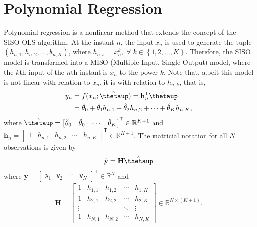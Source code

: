 \documentclass[english]{sobraep}
\newcommand{\trans}{\mathsf{T}}
\begin{document}
\section{Polynomial Regression}

Polynomial regression is a nonlinear method that extends the concept of the SISO OLS algorithm. At the instant \(n\), the input \(x_n\) is used to generate the tuple \(\left( h_{n,1}, h_{n,2}, ..., h_{n,K} \right)\), where \(h_{n,k}=x_n^k,\;\forall\; k \in \left\{ 1, 2, ..., K \right\}\). Therefore, the SISO model is transformed into a MISO (Multiple Input, Single Output) model, where the \(k\)th input of the \(n\)th instant is \(x_n\) to the power \(k\). Note that, albeit this model is not linear with relation to \(x_n\), it is with relation to \(h_{n,k}\), that is,
\begin{align}
    y_n & = f(x_n;\hat{\boldsymbol{\thetaup}}) = \mathbf{h}_n^\trans \hat{\boldsymbol{\thetaup}} \nonumber \\
    & = \hat{\theta}_0 + \hat{\theta}_1 h_{n,1} + \hat{\theta}_2 h_{n,2}  + \cdots + \hat{\theta}_K h_{n,K},
\end{align}
where \(\hat{\boldsymbol{\thetaup}} = \begin{bmatrix}
    \hat{\theta}_0 & \hat{\theta}_0 & \cdots & \hat{\theta}_K
\end{bmatrix}^\trans \in \mathbb{R}^{K+1}\) and \(\mathbf{h}_n = \begin{bmatrix}
    1 & h_{n,1} & h_{n,2} & \cdots & h_{n,K}
\end{bmatrix}^\trans  \in \mathbb{R}^{K+1}\). The matricial notation for all \(N\) observations is given by
\begin{align}
    \hat{\mathbf{y}} = \mathbf{H} \hat{\boldsymbol{\thetaup}}
\end{align}
where \(\mathbf{y} = \begin{bmatrix}
    y_{1} & y_{2} & \cdots & y_{N}
\end{bmatrix}^\trans  \in \mathbb{R}^{N}\) and
\begin{align}
    \mathbf{H} = \begin{bmatrix}
        1 & h_{1,1} & h_{1,2} & \cdots & h_{1,K} \\
        1 & h_{2,1} & h_{2,2} & \cdots & h_{2,K} \\
        \vdots & & & \ddots & \vdots \\
        1 & h_{N,1} & h_{N,2} & \cdots & h_{N,K}
    \end{bmatrix} \in \mathbb{R}^{N\times (K+1)}.
\end{align}
\end{document}

